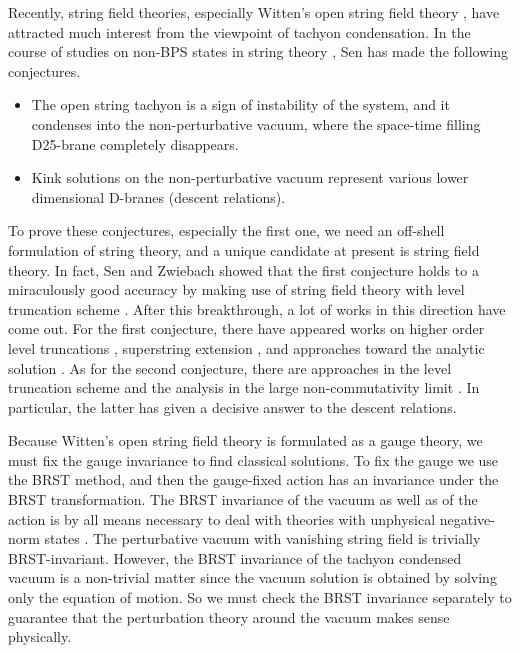 \documentclass[a4paper,12pt]{article}
\begin{document}
Recently, string field theories, especially Witten's
open string field theory \cite{Witten:1986cc}, have attracted much
interest from the viewpoint of tachyon condensation.
In the course of studies on non-BPS states in string
theory \cite{Sen:1999mg,Sen:1998sm,Sen:1999mh},
Sen has made the following conjectures.
\begin{itemize}
\item The open string tachyon is a sign of instability of
  the system, and it condenses into the non-perturbative vacuum,
  where the space-time filling D25-brane completely disappears.
\item Kink solutions on the non-perturbative vacuum represent various
  lower dimensional \mbox{D-branes} (descent relations).
\end{itemize}
To prove these conjectures, especially the first one, we need an
off-shell formulation of string theory, and a unique candidate at
present is string field theory.
In fact, Sen and Zwiebach \cite{SZ} showed that the first conjecture
holds to a miraculously good accuracy by making use of string field
theory with level truncation scheme \cite{Kostelecky:1988ta}.
After this breakthrough, a lot of works in this direction have come
out. For the first conjecture, there have appeared works on
higher order level truncations \cite{Moeller:2000xv},
superstring extension
\cite{Berkovits:2000zj,Berkovits:2000hf,DeSmet:2000dp,Iqbal:2000qg},
and approaches toward the analytic solution
\cite{Sen:1999xm,0006240,Zwiebach:2000dk,Minahan:2000ff,
Kostelecky:2000hz}.
As for the second conjecture, there are approaches in the level
truncation scheme
\cite{Harvey:2000,deMelloKoch:2000ie,Moeller:2000jy,0008053,0008101}
and the analysis in the large non-commutativity limit
\cite{0005006,Harvey:2000jt,Witten:2000nz,Gopakumar:2000rw}.
In particular, the latter has given a decisive answer to the descent
relations.

Because Witten's open string field theory is formulated as a gauge
theory, we must fix the gauge invariance to find classical solutions.
To fix the gauge we use the BRST method, and then the gauge-fixed
action has an invariance under the BRST transformation.
The BRST invariance of the vacuum as well as of the action is by all
means necessary to deal with theories with unphysical negative-norm
states \cite{Kugo:1979gm}. The perturbative vacuum with vanishing
string field is
trivially BRST-invariant. However, the BRST invariance of the
tachyon condensed vacuum is a non-trivial matter since the vacuum
solution is obtained by solving only the equation of motion.
So we must check the BRST invariance separately to guarantee that the
perturbation theory around the vacuum makes sense physically.
\end{document}
